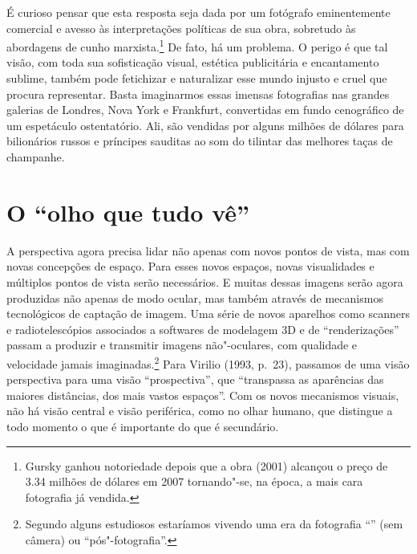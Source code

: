 É curioso pensar que esta resposta seja dada por um fotógrafo
eminentemente comercial e avesso às interpretações políticas de sua
obra, sobretudo às abordagens de cunho marxista.\footnote{Gursky ganhou
  notoriedade depois que a obra {} (2001)
  alcançou o preço de 3.34 milhões de dólares em 2007 tornando"-se, na
  época, a mais cara fotografia já vendida.} De fato, há um problema. O
perigo é que tal visão, com toda sua sofisticação visual, estética
publicitária e encantamento sublime, também pode fetichizar e
naturalizar esse mundo injusto e cruel que procura representar. Basta
imaginarmos essas imensas fotografias nas grandes galerias de Londres,
Nova York e Frankfurt, convertidas em fundo cenográfico de um espetáculo
ostentatório. Ali, são vendidas por alguns milhões de dólares para
bilionários russos e príncipes sauditas ao som do tilintar das melhores
taças de champanhe.

\chapter{O ``olho que tudo vê''}

A perspectiva agora precisa lidar não apenas com novos pontos de vista,
mas com novas concepções de espaço. Para esses novos espaços, novas
visualidades e múltiplos pontos de vista serão necessários. E muitas
dessas imagens serão agora produzidas não apenas de modo ocular, mas
também através de mecanismos tecnológicos de captação de imagem. Uma
série de novos aparelhos como scanners e radiotelescópios associados a
softwares de modelagem 3D e de ``renderizações'' passam a produzir e
transmitir imagens não"-oculares, com qualidade e velocidade jamais
imaginadas.\footnote{Segundo alguns estudiosos estaríamos vivendo uma
  era da fotografia ``{}'' (sem câmera) ou
  ``pós"-fotografia''.} Para Virilio (1993, p.~23), passamos de uma visão
perspectiva para uma visão ``prospectiva'', que ``transpassa as
aparências das maiores distâncias, dos mais vastos espaços''. Com os
novos mecanismos visuais, não há visão central e visão periférica, como
no olhar humano, que distingue a todo momento o que é importante do que
é secundário.

